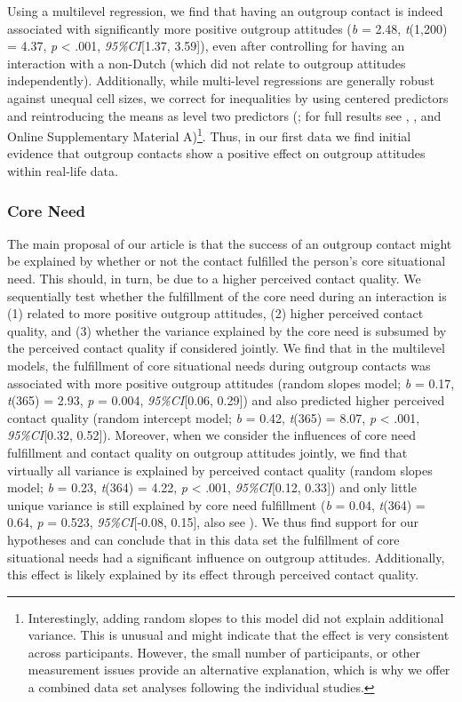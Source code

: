 Using a multilevel regression, we find that having an outgroup contact
is indeed associated with significantly more positive outgroup attitudes
(\textit{b} = 2.48, \textit{t}(1,200) = 4.37, \textit{p} \textless{}
.001, \textit{95\%CI}{[}1.37, 3.59{]}), even after controlling for
having an interaction with a non-Dutch (which did not relate to outgroup
attitudes independently). Additionally, while multi-level regressions
are generally robust against unequal cell sizes, we correct for
inequalities by using centered predictors and reintroducing the means as
level two predictors (\citealp{Yaremych2021}; for full results see
, ,
and Online Supplementary Material
A)\footnote{Interestingly, adding random slopes to this model did not explain additional variance. This is unusual and might indicate that the effect is very consistent across participants. However, the small number of participants, or other measurement issues provide an alternative explanation, which is why we offer a combined data set analyses following the individual studies.}.
Thus, in our first data we find initial evidence that outgroup contacts
show a positive effect on outgroup attitudes within real-life data.

\subsubsection{Core Need}

The main proposal of our article is that the success of an outgroup
contact might be explained by whether or not the contact fulfilled the
person's core situational need. This should, in turn, be due to a higher
perceived contact quality. We sequentially test whether the fulfillment
of the core need during an interaction is (1) related to more positive
outgroup attitudes, (2) higher perceived contact quality, and (3)
whether the variance explained by the core need is subsumed by the
perceived contact quality if considered jointly. We find that in the
multilevel models, the fulfillment of core situational needs during
outgroup contacts was associated with more positive outgroup attitudes
(random slopes model; \textit{b} = 0.17, \textit{t}(365) = 2.93,
\textit{p} = 0.004, \textit{95\%CI}{[}0.06, 0.29{]}) and also predicted
higher perceived contact quality (random intercept model; \textit{b} =
0.42, \textit{t}(365) = 8.07, \textit{p} \textless{} .001,
\textit{95\%CI}{[}0.32, 0.52{]}). Moreover, when we consider the
influences of core need fulfillment and contact quality on outgroup
attitudes jointly, we find that virtually all variance is explained by
perceived contact quality (random slopes model; \textit{b} = 0.23,
\textit{t}(364) = 4.22, \textit{p} \textless{} .001,
\textit{95\%CI}{[}0.12, 0.33{]}) and only little unique variance is
still explained by core need fulfillment (\textit{b} = 0.04,
\textit{t}(364) = 0.64, \textit{p} = 0.523, \textit{95\%CI}{[}-0.08,
0.15{]}, also see ). We thus find support for
our hypotheses and can conclude that in this data set the fulfillment of
core situational needs had a significant influence on outgroup
attitudes. Additionally, this effect is likely explained by its effect
through perceived contact quality.

